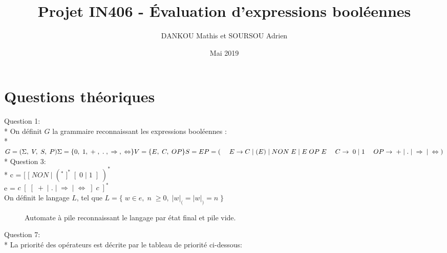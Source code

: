 \documentclass{article}
\title{Projet IN406 - Évaluation d’expressions booléennes}
\author{DANKOU Mathis et SOURSOU Adrien}
\date{Mai 2019}
\begin{document}
\maketitle
\section{Questions théoriques}
Question 1:
\vspace{10px}\\*
On définit $G$ la grammaire reconnaissant les expressions booléennes :
\vspace{5px}\\*
\begin{math}
    G = (\Sigma,\;V,\;S,\;P)\\
	\Sigma =\{0,\;1,\;+\;,\;.\;,\;\Rightarrow\;,\;\Leftrightarrow\}\\
    V = \{E,\;C,\;OP\}\\
    S = E\\ 
    P = ( \\
    \hspace*{3ex} E\rightarrow C\;|\;(E)\;|\;NON \;E\;|\;E\;OP\;E \\
    \hspace*{3ex} C\rightarrow \;0\;|\;1 \\
    \hspace*{3ex} OP\rightarrow \;+\;|\;.\;|\;\Rightarrow\;|\;\Leftrightarrow \\
    )
\end{math}
\vspace{10px}
\\*
Question 3:
\vspace{10px}\\*
c = $[\;[\;NON\;|\;(^*\;]^*\;[\;0\;|\;1\;]\;)^*$ \\
e = $c\;[\;[\;+\;|\;.\;|\;\Rightarrow\;|\;\Leftrightarrow\;]\;c\;]^*$ \\
On définit le langage $L$, tel que $L = \{\; w \in e,\; n\; \geq 0,\; |w|_{(} = |w|_{)} = n\;\}$
\begin{figure}[H]
\caption{Automate à pile reconnaissant le langage par état final et pile vide.}
\end{figure}
\noindent Question 7:
\vspace{10px}\\*
La priorité des opérateurs est décrite par le tableau de priorité ci-dessous:
\vspace{5px}
\end{document}
